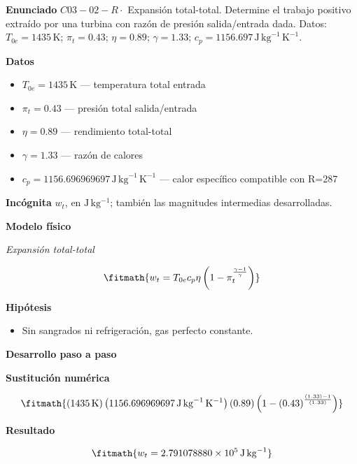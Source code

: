 \documentclass[10pt,openany]{book}
\begin{document}
\begin{tcolorbox}[title={Problema resuelto 2}, studiumworked, breakable]

\noindent\textbf{Enunciado}
\(C03-02-R \cdot\) Expansión total-total. Determine el trabajo positivo extraído por una turbina con razón de presión salida/entrada dada. Datos: \(T_{0e}=1435\, \mathrm{K}\); \(\pi_t=0.43\); \(\eta=0.89\); \(\gamma=1.33\); \(c_p=1156.697\, \mathrm{J}\,\mathrm{kg}^{-1}\,\mathrm{K}^{-1}\).

\noindent\textbf{Datos}
\begin{itemize}
\item $T_{0e} = 1435\,\mathrm{K}$ — temperatura total entrada
\item $\pi_t = 0.43$ — presión total salida/entrada
\item $\eta = 0.89$ — rendimiento total-total
\item $\gamma = 1.33$ — razón de calores
\item $c_p = 1156.696969697\,\mathrm{J}\,\mathrm{kg}^{-1}\,\mathrm{K}^{-1}$ — calor específico compatible con R=287
\end{itemize}

\noindent\textbf{Incógnita}
$w_t$, en $\mathrm{J\,kg^{-1}}$; también las magnitudes intermedias desarrolladas.

\noindent\textbf{Modelo físico}

\noindent\textit{Expansión total-total}

\[
\fitmath{w_t=T_{0e} c_p \eta \left(1 - \pi_t^{\frac{\gamma - 1}{\gamma}}\right)}
\]

\noindent\textbf{Hipótesis}
\begin{itemize}
\item Sin sangrados ni refrigeración, gas perfecto constante.
\end{itemize}

\noindent\textbf{Desarrollo paso a paso}



\noindent\textbf{Sustitución numérica}

\[
\fitmath{\left(1435\,\mathrm{K}\right) \left(1156.696969697\,\mathrm{J}\,\mathrm{kg}^{-1}\,\mathrm{K}^{-1}\right) \left(0.89\right) \left(1 - \left(0.43\right)^{\frac{\left(1.33\right) - 1}{\left(1.33\right)}}\right)}
\]

\noindent\textbf{Resultado}

\[
\fitmath{w_t=2.791078880\times10^{5}\,\mathrm{J}\,\mathrm{kg}^{-1}}
\]


\end{tcolorbox}
\end{document}
